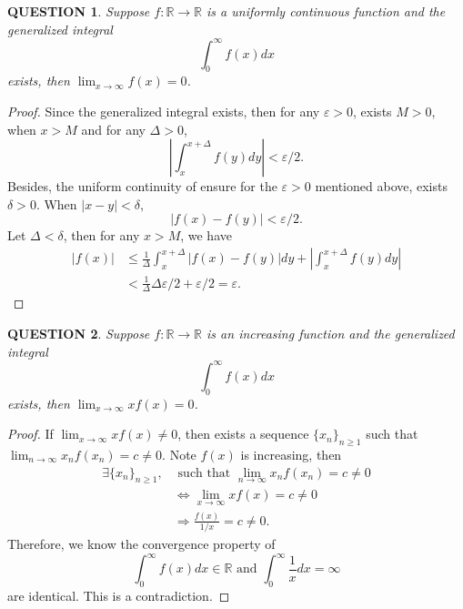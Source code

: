 \documentclass[12pt]{article}
\renewcommand{\(}{\left(}%
\renewcommand{\)}{\right)}%
\renewcommand{\[}{\left[}%
\renewcommand{\]}{\right]}%
\renewcommand{\r}{\mathbb{R}}
\newtheorem{question}{QUESTION}[section]}
\newtheorem{proof}{Proof.}}
\begin{document}
  \begin{question}
  	Suppose $f:\r\to\r$ is a uniformly continuous function and the generalized integral 
  	\begin{equation*}
  		\int_0^\infty f(x)dx
  	\end{equation*}
  	exists, then $\lim_{x\to\infty}f(x)=0$.
  \end{question}
  \begin{proof}
  	Since the generalized integral exists, then for any $\varepsilon>0$, exists $M>0$, when $x>M$ and for any $\Delta>0$,
  	\begin{equation*}
  		\left|\int_x^{x+\Delta} f(y)dy\right|<\varepsilon/2.
  	\end{equation*}
  	Besides, the uniform continuity of ensure for the $\varepsilon>0$ mentioned above, exists $\delta>0$. When $|x-y|<\delta$, 
  	\begin{equation*}
  		|f(x)-f(y)|<\varepsilon/2.
  	\end{equation*}
  	Let $\Delta<\delta$, then for any $x>M$, we have
  	\begin{equation*}
  		 \begin{split}
  		 	|f(x)|&\leq \frac{1}{\Delta} \int_x^{x+\Delta}|f(x)-f(y)|dy+ \left|\int_x^{x+\Delta} f(y)dy\right| \\
  		 	&<\frac{1}{\Delta}\Delta \varepsilon/2+\varepsilon/2=\varepsilon.
  		 \end{split}
  	\end{equation*}
  \end{proof}
  
  \begin{question}
  	Suppose $f:\r\to\r$ is an increasing function and the generalized integral 
  	\begin{equation*}
  		\int_0^\infty f(x)dx
  	\end{equation*}
  	exists, then $\lim_{x\to\infty}xf(x)=0$.
  \end{question}
  \begin{proof}
  	If $\lim_{x\to\infty}xf(x)\neq 0$, then exists a sequence $\{x_n\}_{n\geq 1}$ such that $\lim_{n\to\infty}x_nf(x_n)=c\neq 0$. Note $f(x)$ is increasing, then 
  	\begin{equation*}
  		\begin{split}
  			\exists\{x_n\}_{n\geq 1},&\text{ such that } \lim_{n\to\infty}x_nf(x_n)=c\neq 0\\
  			&\Longleftrightarrow \lim_{x\to\infty}xf(x)=c\neq 0\\
  			&\Longrightarrow \frac{f(x)}{1/x}=c\neq 0.
  		\end{split}
  	\end{equation*}
  	Therefore, we know the convergence property of
  	\begin{equation*}
  		\int_0^\infty f(x)dx\in\r \text{ and }\int_0^\infty \frac{1}{x} dx=\infty
  	\end{equation*}
  	are identical. This is a contradiction.
  \end{proof}
  
\end{document}
